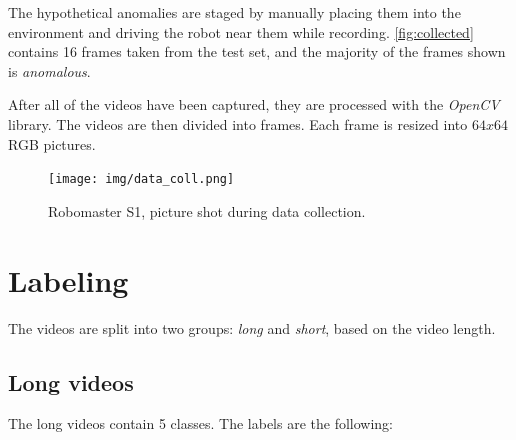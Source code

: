     
    The hypothetical anomalies are staged by manually placing them into the environment and driving the robot near them while recording. \autoref{fig:collected} contains 16 frames taken from the test set, and the majority of the frames shown is \emph{anomalous}.


    After all of the videos have been captured, they are processed with the \textit{OpenCV} library. The videos are then divided into frames. Each frame is resized into $64x64$ RGB pictures. 

    
    \begin{figure}[htpb]
        \centering
        \centerline{\texttt{[image: img/data\_coll.png]}}
        \caption{Robomaster S1, picture shot during data collection.}
        \label{fig:data-coll}
    \end{figure}
    
    \section{Labeling}
        The videos are split into two groups: \emph{long} and \emph{short}, based on the video length.
        
        
        \subsection{Long videos}
        The long videos contain 5 classes. The labels are the following:


